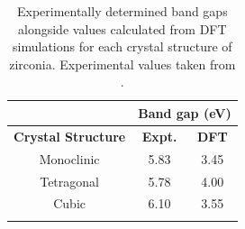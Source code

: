 \begin{table}[htp] %
\onehalfspacing
\centering
\caption{Experimentally determined band gaps alongside values calculated from DFT simulations for each crystal structure of zirconia. Experimental values taken from \cite{French1994}.}
\begin{tabular}{ccc}
{\bf }                                       & \multicolumn{2}{c}{{\bf Band gap (eV)}}      \\ \hline
\multicolumn{1}{c}{{\bf Crystal Structure}} & \multicolumn{1}{c}{{\bf Expt.}} & {\bf DFT} \\ \hline
\multicolumn{1}{c}{Monoclinic}              & \multicolumn{1}{c}{5.83}        & 3.45      \\
\multicolumn{1}{c}{Tetragonal}              & \multicolumn{1}{c}{5.78}        & 4.00      \\
\multicolumn{1}{c}{Cubic}                   & \multicolumn{1}{c}{6.10}         &   3.55 \\ \hline
\label{table:bandgap}
\end{tabular}
\end{table}


